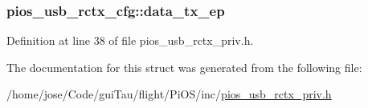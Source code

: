 \hypertarget{structpios__usb__rctx__cfg_ae5eb2a2117797f91ee47f0535032cd54}{
\subsubsection[{data\-\_\-tx\-\_\-ep}]{ pios\-\_\-usb\-\_\-rctx\-\_\-cfg\-::data\-\_\-tx\-\_\-ep}}\label{structpios__usb__rctx__cfg_ae5eb2a2117797f91ee47f0535032cd54}


Definition at line 38 of file pios\-\_\-usb\-\_\-rctx\-\_\-priv.\-h.



The documentation for this struct was generated from the following file\-:\begin{DoxyCompactItemize}
\item 
/home/jose/\-Code/gui\-Tau/flight/\-Pi\-O\-S/inc/\hyperlink{pios__usb__rctx__priv_8h}{pios\-\_\-usb\-\_\-rctx\-\_\-priv.\-h}\end{DoxyCompactItemize}
